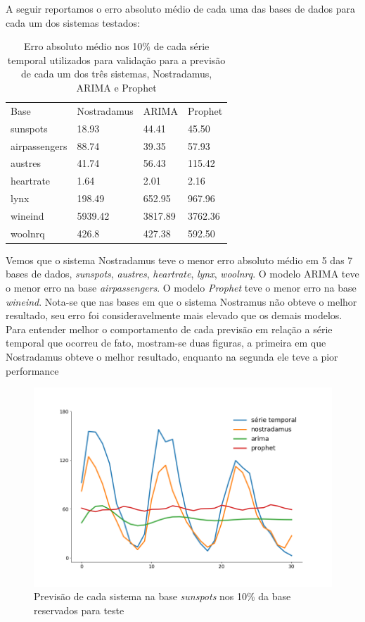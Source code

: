 \documentclass[twocolumn]{rbef}
\newcommand{\1}{\mathbbm{1}}
\begin{document}
A seguir reportamos o erro absoluto médio de cada uma das bases de dados para cada um dos sistemas testados:

\begin{table}[!htb]
    \caption{Erro absoluto médio nos 10\% de cada série temporal utilizados para validação para a previsão de cada um dos três sistemas, Nostradamus, ARIMA e Prophet}
    \center
    \begin{tabular}{llll}
	    Base & Nostradamus & ARIMA & Prophet \\
	    sunspots & 18.93 & 44.41 & 45.50  \\
	    airpassengers & 88.74 & 39.35 & 57.93 \\
	    austres & 41.74 & 56.43 & 115.42  \\
	    heartrate & 1.64 & 2.01 & 2.16  \\
	    lynx & 198.49 & 652.95 & 967.96  \\
	    wineind & 5939.42 & 3817.89 & 3762.36  \\
	    woolnrq & 426.8 & 427.38 & 592.50  \\
    \end{tabular}
\end{table}


Vemos que o sistema Nostradamus teve o menor erro absoluto médio em 5 das 7 bases de dados, \textit{sunspots}, \textit{austres}, \textit{heartrate}, \textit{lynx}, \textit{woolnrq}. O modelo ARIMA teve o menor erro na base \textit{airpassengers}. O modelo \textit{Prophet} teve o menor erro na base \textit{wineind}. Nota-se que nas bases em que o sistema Nostramus não obteve o melhor resultado, seu erro foi consideravelmente mais elevado que os demais modelos. Para entender melhor o comportamento de cada previsão em relação a série temporal que ocorreu de fato, mostram-se duas figuras, a primeira em que Nostradamus obteve o melhor resultado, enquanto na segunda ele teve a pior performance

\begin{figure}[!htb]
	\centering \includegraphics[scale=0.3]{fig1.png}
	\caption{Previsão de cada sistema na base \textit{sunspots} nos 10\% da base reservados para teste}
	\label{fig1}
\end{figure}
\end{document}
